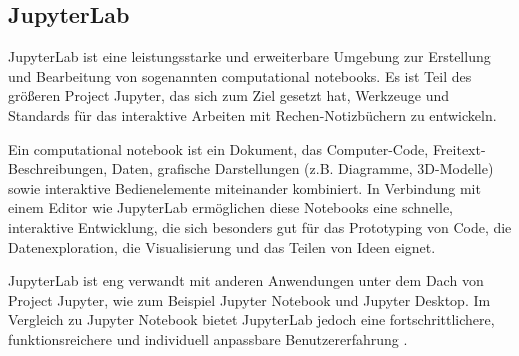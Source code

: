 \subsection{JupyterLab}
JupyterLab ist eine leistungsstarke und erweiterbare Umgebung zur Erstellung und Bearbeitung von sogenannten computational notebooks. Es ist Teil des größeren Project Jupyter, das sich zum Ziel gesetzt hat, Werkzeuge und Standards für das interaktive Arbeiten mit Rechen-Notizbüchern zu entwickeln.

Ein computational notebook ist ein Dokument, das Computer-Code, Freitext-Beschreibungen, Daten, grafische Darstellungen (z.B. Diagramme, 3D-Modelle) sowie interaktive Bedienelemente miteinander kombiniert. In Verbindung mit einem Editor wie JupyterLab ermöglichen diese Notebooks eine schnelle, interaktive Entwicklung, die sich besonders gut für das Prototyping von Code, die Datenexploration, die Visualisierung und das Teilen von Ideen eignet.

JupyterLab ist eng verwandt mit anderen Anwendungen unter dem Dach von Project Jupyter, wie zum Beispiel Jupyter Notebook und Jupyter Desktop. Im Vergleich zu Jupyter Notebook bietet JupyterLab jedoch eine fortschrittlichere, funktionsreichere und individuell anpassbare Benutzererfahrung \cite{jupyterlab_docs}.